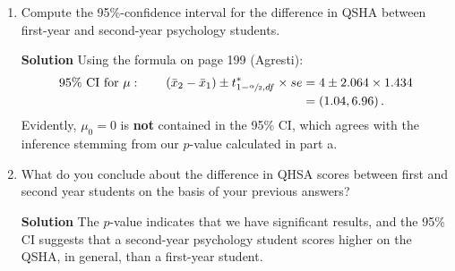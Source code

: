 \begin{enumerate}
\begin{enumerate}
        \item Compute the 95\%-confidence interval for the difference in QSHA between first-year and second-year psychology students.
        \begin{framed}{\textbf{Solution}}
        Using the formula on page 199 (Agresti):
        \begin{align}
            \text{95\% CI for } \mu : \qquad \left( \bar{x}_2 - \bar{x}_1\right) \pm t^*_{1 - \sfrac{\alpha}{2}, df} \times se &= 4 \pm 2.064 \times 1.434 \\
            &= \left( 1.04, 6.96\right).
        \end{align}
        Evidently, $\mu_0 = 0$ is \textbf{not} contained in the 95\% CI, which agrees with the inference stemming from our $p$-value calculated in part a.
        \end{framed}
        
        \item What do you conclude about the difference in QHSA scores between first and second year students on the basis of your previous answers?
        \begin{framed}{\textbf{Solution}}
        The $p$-value indicates that we have significant results, and the 95\% CI suggests that a second-year psychology student scores higher on the QSHA, in general, than a first-year student.
        \end{framed}
    \end{enumerate}
    

\end{enumerate}
